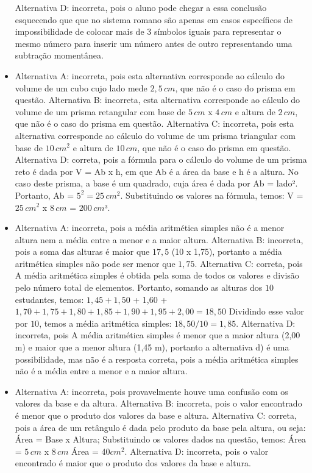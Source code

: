 \begin{itemize}
Alternativa D: incorreta, pois o aluno pode chegar a essa conclusão
esquecendo que que no sistema romano são apenas em casos específicos de
impossibilidade de colocar mais de $3$ símbolos iguais para representar o
mesmo número para inserir um número antes de outro representando uma
subtração momentânea.
\item Alternativa A: incorreta, pois esta alternativa corresponde ao cálculo
do volume de um cubo cujo lado mede $2,5\,cm$, que não é o caso do prisma
em questão.
Alternativa B: incorreta, esta alternativa corresponde ao cálculo do
volume de um prisma retangular com base de $5\,cm$ x $4\,cm$ e altura de $2\,cm$,
que não é o caso do prisma em questão.
Alternativa C: incorreta, pois esta alternativa corresponde ao cálculo
do volume de um prisma triangular com base de $10\,cm^2$ e altura de $10\,cm$,
que não é o caso do prisma em questão.
Alternativa D: correta, pois a fórmula para o cálculo do volume de um
prisma reto é dada por V = Ab x h, em que Ab é a área da base e h é a
altura. No caso deste prisma, a base é um quadrado, cuja área é dada por
Ab = lado². Portanto, Ab = $5^2 = 25\,cm^2$. Substituindo os valores na
fórmula, temos: V = $25\,cm^2$ x $8\,cm$ = $200\,cm$³.
\item Alternativa A: incorreta, pois a média aritmética simples não é a menor
altura nem a média entre a menor e a maior altura.
Alternativa B: incorreta, pois a soma das alturas é maior que $17,5$ (10 x
1,75), portanto a média aritmética simples não pode ser menor que $1,75$.
Alternativa C: correta, pois A média aritmética simples é obtida pela
soma de todos os valores e divisão pelo número total de elementos.
Portanto, somando as alturas dos $10$ estudantes, temos: $1,45 + 1,50$ +
1,60 + $1,70 + 1,75 + 1,80 + 1,85 + 1,90 + 1,95 + 2,00 = 18,50$ Dividindo
esse valor por $10$, temos a média aritmética simples: $18,50 / 10 = 1,85$.
Alternativa D: incorreta, pois A média aritmética simples é menor que a
maior altura (2,00 m) e maior que a menor altura (1,45 m), portanto a
alternativa d) é uma possibilidade, mas não é a resposta correta, pois a
média aritmética simples não é a média entre a menor e a maior altura.
\item Alternativa A: incorreta, pois provavelmente houve uma confusão com os
valores da base e da altura.
Alternativa B: incorreta, pois o valor encontrado é menor que o produto
dos valores da base e altura.
Alternativa C: correta, pois a área de um retângulo é dada pelo produto
da base pela altura, ou seja: Área = Base x Altura; Substituindo os valores dados na questão, temos: Área = $5\,cm$ x $8\,cm$ Área = $40cm^2$.
Alternativa D: incorreta, pois o valor encontrado é maior que o produto
dos valores da base e altura.
\end{itemize}

